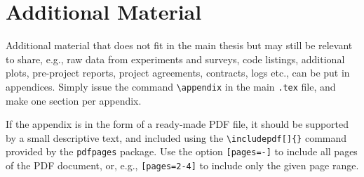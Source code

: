 \section{Additional Material}
\label{app:additional}

Additional material that does not fit in the main thesis but may still be relevant to share, e.g., raw data from experiments and surveys, code listings, additional plots, pre-project reports, project agreements, contracts, logs etc., can be put in appendices. Simply issue the command \texttt{\textbackslash appendix} in the main \texttt{.tex} file, and make one section per appendix.

If the appendix is in the form of a ready-made PDF file, it should be supported by a small descriptive text, and included using the \texttt{\textbackslash includepdf[]\{\}} command provided by the \texttt{pdfpages} package. Use the option \texttt{[pages=-]} to include all pages of the PDF document, or, e.g., \texttt{[pages=2-4]} to include only the given page range.